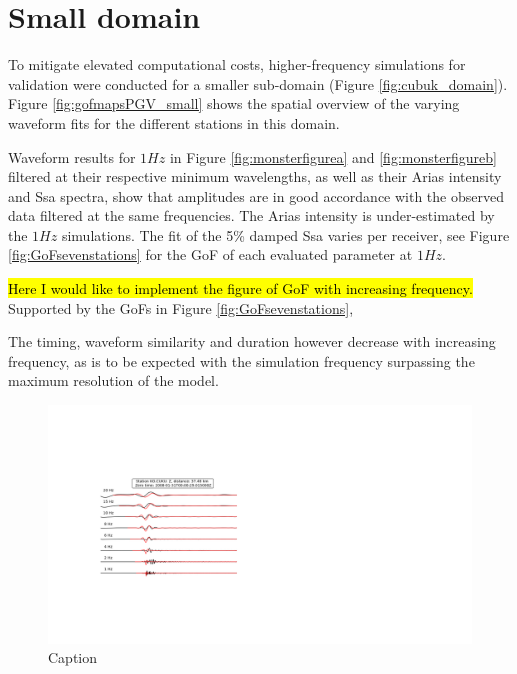 \documentclass[../Text/00main.tex]{subfiles}
\begin{document}


\section{Small domain}

To mitigate elevated computational costs, higher-frequency simulations for validation were conducted for a smaller sub-domain (Figure \ref{fig:cubuk_domain}). Figure \ref{fig:gofmapsPGV_small} shows the spatial overview of the varying waveform fits for the different stations in this domain.  

Waveform results for $1 Hz$ in Figure \ref{fig:monsterfigurea} and \ref{fig:monsterfigureb} filtered at their respective minimum wavelengths, as well as their Arias intensity and Ssa spectra, show that amplitudes are in good accordance with the observed data filtered at the same frequencies. The Arias intensity is under-estimated by the $1 Hz$ simulations. The fit of the 5\% damped Ssa varies per receiver, see Figure \ref{fig:GoFsevenstations} for the GoF of each evaluated parameter at $1 Hz$. 

\hl{Here I would like to implement the figure of GoF with increasing frequency.}
Supported by the GoFs in Figure \ref{fig:GoFsevenstations}, 

The timing, waveform similarity and duration however decrease with increasing frequency, as is to be expected with the simulation frequency surpassing the maximum resolution of the model. 


\begin{figure}
    \centering
    \includegraphics[width=0.5\linewith, trim = 5 cm 8 cm 20 cm 5 cm, clip]{images_results/manyfreqs.png}
    \caption{Caption}
    \label{fig:my_label}
\end{figure}
\end{document}
